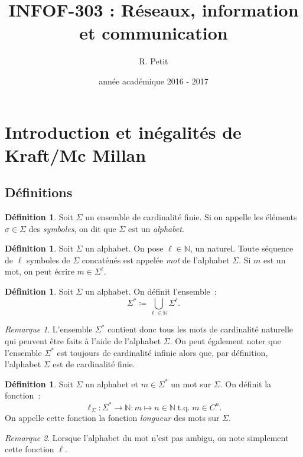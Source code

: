 \documentclass{article}
\title{INFOF-303 : Réseaux, information et communication}
\author{R. Petit}
\date{année académique 2016 - 2017}
\DeclareMathOperator{\tq}{\text{ t.q. }}
\newcommand{\N}{\mathbb N}
\theoremstyle{definition}
\newtheorem{déf}[thm]{Définition}
\theoremstyle{remark}
\newtheorem*{rmq}{Remarque}
\begin{document}
\maketitle
\tableofcontents
\newpage
\setcounter{page}{1}

\section{Introduction et inégalités de Kraft/Mc Millan}
	\subsection{Définitions}
		\begin{déf} Soit $\Sigma$ un ensemble de cardinalité finie. Si on appelle les éléments $\sigma \in \Sigma$ des \textit{symboles},
		on dit que $\Sigma$ est un \textit{alphabet}. \end{déf}

		\begin{déf} Soit $\Sigma$ un alphabet. On pose $\ell \in \N$, un naturel. Toute séquence de $\ell$ symboles de $\Sigma$ concaténés est appelée
		\textit{mot} de l'alphabet $\Sigma$. Si $m$ est un mot, on peut écrire $m \in \Sigma^\ell$. \end{déf}

		\begin{déf} Soit $\Sigma$ un alphabet. On définit l'ensemble~:
		\[\Sigma^{*} \coloneqq \bigcup_{\ell \in \N}\Sigma^\ell.\]
		\end{déf}

		\begin{rmq} L'ensemble $\Sigma^{*}$ contient donc tous les mots de cardinalité naturelle qui peuvent être faits à l'aide de l'alphabet $\Sigma$.
		On peut également noter que l'ensemble $\Sigma^*$ est toujours de cardinalité infinie alors que, par définition, l'alphabet $\Sigma$ est de
		cardinalité finie. \end{rmq}

		\begin{déf} Soit $\Sigma$ un alphabet et $m \in \Sigma^*$ un mot sur $\Sigma$. On définit la fonction~:
		\[\ell_\Sigma : \Sigma^* \to \N : m \mapsto n \in \N \tq m \in C^n.\]
		On appelle cette fonction la fonction \textit{longueur} des mots sur $\Sigma$. \end{déf}

		\begin{rmq} Lorsque l'alphabet du mot n'est pas ambigu, on note simplement cette fonction $\ell$. \end{rmq}
\end{document}
